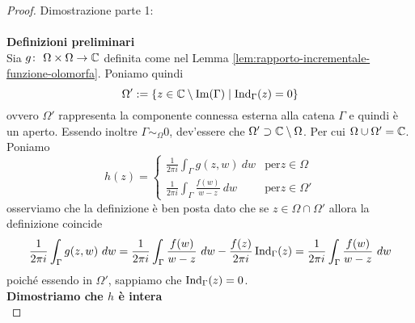 \begin{proof}Dimostrazione parte 1:\\ \\

    \textbf{Definizioni preliminari}\\

    Sia $g \colon\ \Omega\times\Omega \rightarrow \mathbb{C}$ definita come nel Lemma
    \ref{lem:rapporto-incrementale-funzione-olomorfa}. 
    Poniamo quindi 
    \begin{equation*}
        \Omega' := \left\{ z \in \mathbb{C} \setminus \operatorname{Im}(\Gamma) \mid
            \operatorname{Ind}_\Gamma(z) = 0  \right\}
    \end{equation*}
    ovvero $\Omega'$ rappresenta la componente connessa esterna alla catena
    $\Gamma$ e quindi è un aperto. %
    Essendo inoltre $\Gamma \sim_\Omega 0$, dev'essere che $\Omega' \supset
    \mathbb{C} \setminus \Omega$.  Per cui $\Omega \cup \Omega' = \mathbb{C}$. Poniamo 
    \begin{equation*}
      h(z) = \begin{cases}
        \frac{1}{2\pi i} \int_\Gamma g(z,w)\ dw  & \text{per} z \in \Omega \\
        \frac{1}{2\pi i} \int_\Gamma \frac{f(w)}{w-z}\ dw \ & \text{per}
        z \in \Omega' 
      \end{cases}
    \end{equation*}
    osserviamo che la definizione è ben posta dato che se $z \in \Omega \cap
    \Omega'$ allora la definizione coincide
    \begin{equation*}
      \frac{1}{2\pi i} \int_\Gamma g(z,w)\ dw =  
            \frac{1}{2\pi i} \int_\Gamma \frac{f(w)}{w-z}\ dw - 
            \frac{f(z)}{2\pi i} \operatorname{Ind}_\Gamma(z) 
            = \frac{1}{2\pi i} \int_\Gamma \frac{f(w)}{w-z}\ dw        
    \end{equation*}
    poiché essendo in $\Omega'$, sappiamo che $\operatorname{Ind}_\Gamma(z)
    = 0$. \\
    
    \textbf{Dimostriamo che $h$ è intera}\\


\end{proof}

